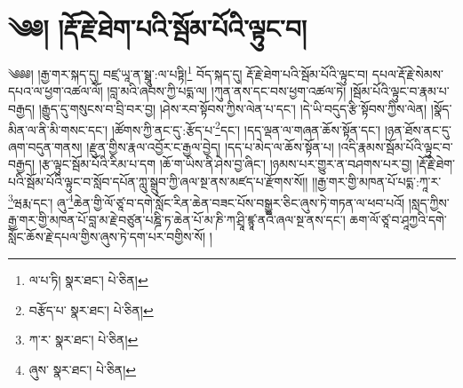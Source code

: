\setcounter{footnote}{0} 
\chapter{༄༅། །རྡོ་རྗེ་ཐེག་པའི་སྦོམ་པོའི་ལྟུང་བ།}༄༅༅། །རྒྱ་གར་སྐད་དུ། བཛྲ་ཡཱ་ན་སྠཱུ་:ལ་པཏྟི།\footnote{ལ་པ་ཏི།  སྣར་ཐང་།  པེ་ཅིན། } བོད་སྐད་དུ། རྡོ་རྗེ་ཐེག་པའི་སྦོམ་པོའི་ལྟུང་བ། དཔལ་རྡོ་རྗེ་སེམས་དཔའ་ལ་ཕྱག་འཚལ་ལོ། །བླ་མའི་ཞབས་ཀྱི་པདྨ་ལ། །ཀུན་ནས་དང་བས་ཕྱག་འཚལ་ཏེ། །སྦོམ་པོའི་ལྟུང་བ་རྣམ་པ་བརྒྱད། །རྒྱུད་དུ་གསུངས་བ་བྲི་བར་བྱ། །ཤེས་རབ་སྟོབས་ཀྱིས་ལེན་པ་དང་། །དེ་ཡི་བདུད་རྩི་སྟོབས་ཀྱིས་ལེན། །སྣོད་མིན་ལ་ནི་མི་གསང་དང་། །ཚོགས་ཀྱི་ནང་དུ་:རྩོད་པ་\footnote{བརྩོད་པ་  སྣར་ཐང་།  པེ་ཅིན། }དང་། །དད་ལྡན་ལ་གཞན་ཆོས་སྟོན་དང་། །ཉན་ཐོས་ནང་དུ་ཞག་བདུན་གནས། །རྫུན་གྱིས་རྣལ་འབྱོར་ང་རྒྱལ་བྱེད། །དད་པ་མེད་ལ་ཆོས་སྟོན་པ། །འདི་རྣམས་སྦོམ་པོའི་ལྟུང་བ་བརྒྱད། །རྩ་ལྟུང་སྦོམ་པོའི་རིམ་པ་དག །ཆོ་ག་ཡིས་ནི་ཤེས་བྱ་ཞིང་། །ཉམས་པར་གྱུར་ན་བཤགས་པར་བྱ། །རྡོ་རྗེ་ཐེག་པའི་སྦོམ་པོའི་ལྟུང་བ་སློབ་དཔོན་ཀླུ་སྒྲུབ་ཀྱི་ཞལ་སྔ་ནས་མཛད་པ་རྫོགས་སོ།། །།རྒྱ་གར་གྱི་མཁན་པོ་པདྨ་:ཀཱ་ར་\footnote{ཀ་ར་  སྣར་ཐང་།  པེ་ཅིན། }ཝརྨ་དང་། ཞུ་\footnote{ཞུས་  སྣར་ཐང་།  པེ་ཅིན། }ཆེན་གྱི་ལོ་ཙཱ་བ་དགེ་སློང་རིན་ཆེན་བཟང་པོས་བསྒྱུར་ཅིང་ཞུས་ཏེ་གཏན་ལ་ཕབ་པའོ། །སླད་ཀྱིས་རྒྱ་གར་གྱི་མཁན་པོ་བླ་མ་རྗེ་བཙུན་པཎྜི་ཏ་ཆེན་པོ་མ་ཎི་ཀ་ཤྲཱི་ཛྙཱ་ནའི་ཞལ་སྔ་ནས་དང་། ཆག་ལོ་ཙཱ་བ་ཤཱཀྱའི་དགེ་སློང་ཆོས་རྗེ་དཔལ་གྱིས་ཞུས་ཏེ་དག་པར་བགྱིས་སོ། ། 